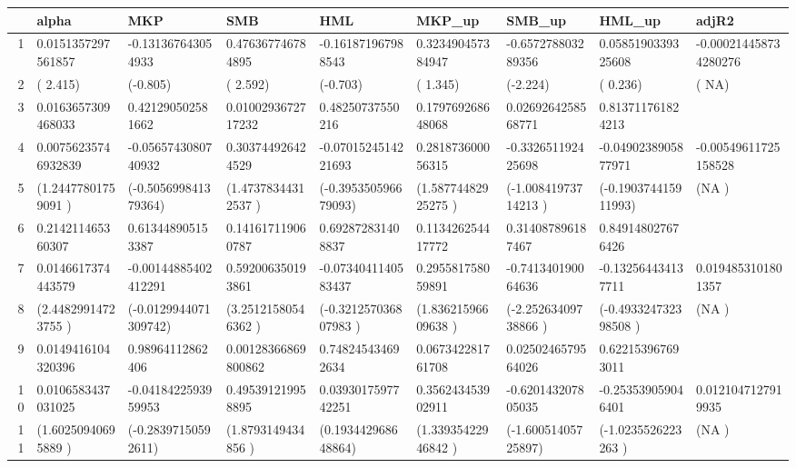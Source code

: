 \begin{table}[ht]
\centering
\begin{tabular}{rllllllll}
  \hline
 & alpha & MKP & SMB & HML & MKP\_up & SMB\_up & HML\_up & adjR2 \\ 
  \hline
1 & 0.0151357297561857 & -0.131367643054933 & 0.476367746784895 & -0.161871967988543 & 0.323490457384947 & -0.657278803289356 & 0.0585190339325608 & -0.000214458734280276 \\ 
  2 & ( 2.415) & (-0.805) & ( 2.592) & (-0.703) & ( 1.345) & (-2.224) & ( 0.236) & (    NA) \\ 
  3 & 0.0163657309468033 & 0.421290502581662 & 0.0100293672717232 & 0.48250737550216 & 0.179769268648068 & 0.0269264258568771 & 0.813711761824213 &  \\ 
  4 & 0.00756235746932839 & -0.0565743080740932 & 0.303744926424529 & -0.0701524514221693 & 0.281873600056315 & -0.332651192425698 & -0.0490238905877971 & -0.00549611725158528 \\ 
  5 & (1.24477801759091  ) & (-0.505699841379364) & (1.47378344312537  ) & (-0.395350596679093) & (1.58774482925275  ) & (-1.00841973714213 ) & (-0.190374415911993) & (NA                ) \\ 
  6 & 0.214211465360307 & 0.613448905153387 & 0.141617119060787 & 0.692872831408837 & 0.113426254417772 & 0.314087896187467 & 0.849148027676426 &  \\ 
  7 & 0.0146617374443579 & -0.00144885402412291 & 0.592006350193861 & -0.0734041140583437 & 0.295581758059891 & -0.741340190064636 & -0.132564434137711 & 0.0194853101801357 \\ 
  8 & (2.44829914723755   ) & (-0.0129944071309742) & (3.25121580546362   ) & (-0.321257036807983 ) & (1.83621596609638   ) & (-2.25263409738866  ) & (-0.493324732398508 ) & (NA                 ) \\ 
  9 & 0.0149416104320396 & 0.98964112862406 & 0.00128366869800862 & 0.748245434692634 & 0.067342281761708 & 0.0250246579564026 & 0.622153967693011 &  \\ 
  10 & 0.0106583437031025 & -0.0418422593959953 & 0.495391219958895 & 0.0393017597742251 & 0.356243453902911 & -0.620143207805035 & -0.253539059046401 & 0.0121047127919935 \\ 
  11 & (1.60250940695889 ) & (-0.28397150592611) & (1.8793149434856  ) & (0.193442968648864) & (1.33935422946842 ) & (-1.60051405725897) & (-1.0235526223263 ) & (NA               ) \\ 

\end{tabular}
\end{table}
